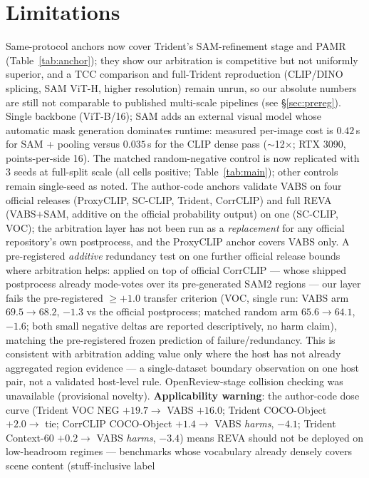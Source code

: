 \documentclass[11pt]{article}
\newcommand{\reva}{REVA}
\begin{document}
\section{Limitations}
\label{sec:limitations}
Same-protocol anchors now cover Trident's SAM-refinement stage and PAMR
(Table~\ref{tab:anchor}); they show our arbitration is competitive but not uniformly
superior, and a TCC comparison and full-Trident reproduction (CLIP/DINO splicing, SAM
ViT-H, higher resolution) remain unrun, so our absolute numbers are still not
comparable to published multi-scale pipelines (see \S\ref{sec:prereg}). Single backbone
(ViT-B/16); SAM adds an external visual model whose automatic mask generation
dominates runtime: measured per-image cost is $0.42$\,s for SAM + pooling versus
$0.035$\,s for the CLIP dense pass ($\sim$12$\times$; RTX 3090, points-per-side 16).
The matched random-negative control is now replicated with 3 seeds at
full-split scale (all cells positive; Table~\ref{tab:main}); other controls
remain single-seed as noted. The author-code anchors validate VABS on four
official releases (ProxyCLIP, SC-CLIP, Trident, CorrCLIP) and full \reva{}
(VABS$+$SAM, additive on the official probability output) on one (SC-CLIP,
VOC); the arbitration layer has not been run as a \emph{replacement} for
any official repository's own postprocess, and the ProxyCLIP anchor covers
VABS only. A pre-registered \emph{additive} redundancy test on one further
official release bounds where arbitration helps: applied on top of
official CorrCLIP --- whose shipped postprocess already mode-votes over
its pre-generated SAM2 regions --- our layer fails the pre-registered
$\geq+1.0$ transfer criterion (VOC, single run: VABS arm $69.5 \to 68.2$,
$-1.3$ vs the official postprocess; matched random arm $65.6 \to 64.1$,
$-1.6$; both small negative deltas are reported descriptively, no harm
claim), matching the pre-registered frozen prediction of
failure/redundancy. This is consistent with arbitration adding value only
where the host has not already aggregated region evidence --- a
single-dataset boundary observation on one host pair, not a validated
host-level rule. OpenReview-stage collision checking was
unavailable (provisional novelty). \textbf{Applicability warning}: the
author-code dose curve (Trident VOC NEG $+19.7 \to$ VABS $+16.0$;
Trident COCO-Object $+2.0 \to$ tie; CorrCLIP COCO-Object $+1.4 \to$ VABS
\emph{harms}, $-4.1$; Trident Context-60 $+0.2 \to$ VABS \emph{harms},
$-3.4$) means
\reva{} should not be deployed on low-headroom regimes --- benchmarks whose
vocabulary already densely covers scene content (stuff-inclusive label
\end{document}
